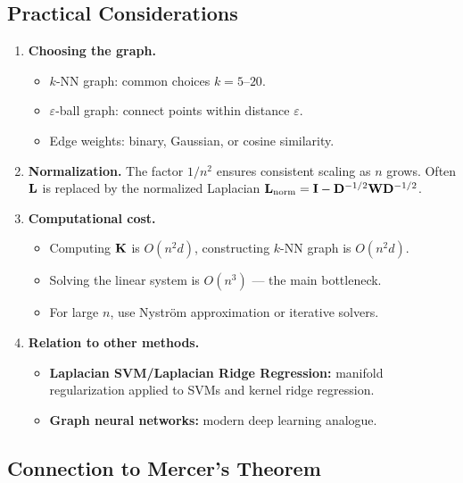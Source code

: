 \begin{notechapter}
\subsection{Practical Considerations}
\label{rkhs:subsec:manifold_practical}

\begin{enumerate}[label=\textbf{\arabic*.}]
  \item \textbf{Choosing the graph.} 
  \begin{itemize}
    \item $k$-NN graph: common choices $k = 5$--$20$. 
    \item $\varepsilon$-ball graph: connect points within distance $\varepsilon$.
    \item Edge weights: binary, Gaussian, or cosine similarity.
  \end{itemize}
  
  \item \textbf{Normalization.} The factor $1/n^2$ ensures consistent 
    scaling as $n$ grows. Often $\mathbf{L}$ is replaced by the normalized 
    Laplacian $\mathbf{L}_{\text{norm}} = \mathbf{I} - \mathbf{D}^{-1/2}\mathbf{W}
    \mathbf{D}^{-1/2}$.
  
  \item \textbf{Computational cost.} 
  \begin{itemize}
    \item Computing $\mathbf{K}$ is $O(n^2 d)$, constructing $k$-NN graph 
      is $O(n^2 d)$.
    \item Solving the linear system is $O(n^3)$ — the main bottleneck.
    \item For large $n$, use Nystr\"om approximation or iterative solvers.
  \end{itemize}
  
  \item \textbf{Relation to other methods.}
  \begin{itemize}
    \item \textbf{Laplacian SVM/Laplacian Ridge Regression:} manifold 
      regularization applied to SVMs and kernel ridge regression.
    \item \textbf{Graph neural networks:} modern deep learning analogue.
  \end{itemize}
\end{enumerate}

\subsection{Connection to Mercer's Theorem}
\label{rkhs:subsec:manifold_mercer}


\end{notechapter}

